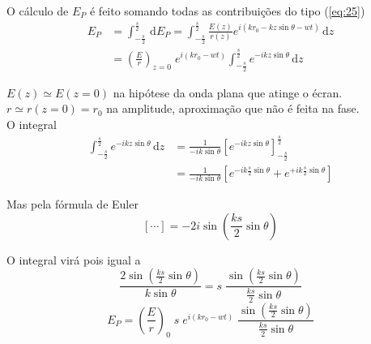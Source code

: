 \documentclass[a4paper,12pt]{article}
\newcommand{\ud}{\,\mathrm{d}}
\begin{document}
O cálculo de $E_P$ é feito somando todas as contribuições do tipo (\ref{eq:25}) 
\begin{align}
	E_P &= \int_{-\frac{s}{2}}^\frac{s}{2} \ud E_P = \int_{-\frac{s}{2}}^\frac{s}{2} \frac{E(z)}{r(z)} e^{i (k r_0 - k z \sin \theta -w t) } \ud z \nonumber\\
	&= ( \frac{E}{r} )_{z=0}\; e^{i (k r_0 -w t) } \int_{-\frac{s}{2}}^\frac{s}{2} e^{ -i k z \sin \theta } \ud z 
\end{align}

$E(z) \simeq E(z=0) $ na hipótese da onda plana que atinge o écran.\\
$r \simeq r(z=0) = r_0 $ na amplitude, aproximação que não é feita na fase.\\
O integral 
\begin{align} \label{eq:28}
	\int_{-\frac{s}{2}}^\frac{s}{2} e^{ -i k z \sin \theta } \ud z &= \frac{1}{-i k \sin \theta } \left[ e^{ -i k z \sin \theta } \right]_{-\frac{s}{2}}^\frac{s}{2}\nonumber \\
	&= \frac{1}{-i k  \sin \theta } \left[ e^{ -i k \frac{s}{2} \sin \theta } + e^{ +i k \frac{s}{2} \sin \theta } \right] 
\end{align}

Mas pela fórmula de Euler 
\begin{equation}
	\label{eq:29} \left[ \cdots \right] = -2 i \sin( \frac{k s}{2}\sin \theta) 
\end{equation}

O integral virá pois igual a 
\begin{equation*}
	\frac{2 \sin( \frac{k s}{2}\sin \theta)}{  k \sin \theta}= s \; \frac{ \sin( \frac{k s}{2}\sin \theta)}{ \frac{k s}{2}\sin \theta} 
\end{equation*}
\begin{equation}
	\label{eq:30} E_P = \left( \frac{E}{r} \right)_0 \; s \; e^{i(k r_0 -wt) } \;\frac{ \sin( \frac{k s}{2}\sin \theta)}{ \frac{k s}{2}\sin \theta} 
\end{equation}
\end{document}
